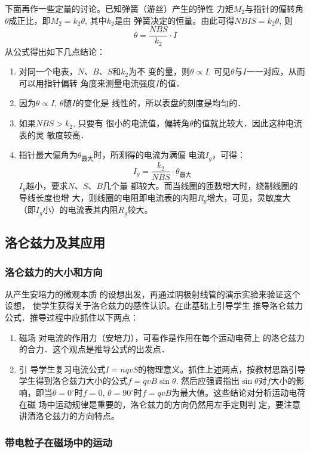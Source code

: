 下面再作一些定量的讨论。已知弹簧（游丝）产生的弹性
力矩$M_2$与指针的偏转角$\theta$成正比，即$M_2=k_2\theta$, 其中$k_2$是由
弹簧决定的恒量。由此可得$NBIS=k_2\theta$, 则
\[\theta=\frac{NBS}{k_2}\cdot I\]
从公式得出如下几点结论：
\begin{enumerate}
\item 对同一个电表，$N$、$B$、$S$和$k_2$为不
变的量，则$\theta\propto I$. 可见$\theta$与$I$一一对应，从而可以用指针偏转
角度来测量电流强度$I$的值．
    \item 因为$\theta\propto I$, $\theta$随$I$的变化是
线性的，所以表盘的刻度是均匀的．    
\item 如果$NBS>k_2$, 只要有
很小的电流值，偏转角$\theta$的值就比较大．因此这种电流表的灵
敏度较高． 
   \item 指针最大偏角为$\theta_{\text{最大}}$时，所测得的电流为满偏
电流$I_g$，可得：
\[I_g=\frac{k_2}{NBS}\cdot \theta_{\text{最大}}\]
$I_g$越小，要求$N$、$S$、$B$几个量
都较大。而当线圈的匝数增大时，绕制线圈的导线长度也增
大，则线圈的电阻即电流表的内阻$R_g$增大，可见，灵敏度大
（即$I_g$小）的电流表其内阻$R_g$较大。
\end{enumerate}

\subsection{洛仑兹力及其应用}
\subsubsection{洛仑兹力的大小和方向}

从产生安培力的微观本质
的设想出发，再通过阴极射线管的演示实验来验证这个设想，
使学生获得关于洛仑兹力的感性认识。在此基础上引导学生
推导洛仑兹力公式．推导过程中应抓住以下两点：
\begin{enumerate}
\item 磁场
对电流的作用力（安培力），可看作是作用在每个运动电荷上
的洛仑兹力的合力．这个观点是推导公式的出发点．
\item 引
导学生复习电流公式$I=nqvS$的物理意义。抓住上述两点，按教材思路引导学生得到洛仑兹力大小的公式$f=qvB\sin \theta$.
然后应强调指出$\sin\theta$对$f$大小的影响，即当$\theta=0^{\circ}$时$f=0$, 
$\theta=90^{\circ}$时$f=qvB$为最大值。这些结论对分析运动电荷在磁
场中运动规律是重要的，洛仑兹力的方向仍然用左手定则判
定，要注意讲清洛仑兹力的方向特点。
\end{enumerate}

\subsubsection{带电粒子在磁场中的运动}

